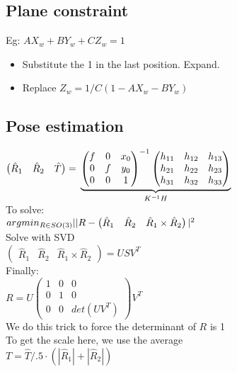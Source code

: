\subsection*{Plane constraint}
Eg: $A X_w + B Y_w + C Z_w = 1$
\begin{itemize}
  \item Substitute the 1 in the last position. Expand.
  \item Replace $Z_w = 1/C (1 - A X_w - B Y_w)$
\end{itemize}

\subsection*{Pose estimation}
$\begin{pmatrix} \hat{R}_1 & \hat{R}_2 & \hat{T}\end{pmatrix}
=\\
\underbrace{
\begin{pmatrix}
  f & 0 & x_0 \\ 0 & f &y_0\\0 & 0 & 1
\end{pmatrix}^{-1}
\begin{pmatrix}
  h_{11} & h_{12} & h_{13} \\
  h_{21} & h_{22} & h_{23} \\
  h_{31} & h_{32} & h_{33}
\end{pmatrix}
}_{K^{-1} H}
$\\
To solve:\\
$argmin_{R\in SO(3)}\\
||R -
\begin{pmatrix}
  \hat{R}_1 & \hat{R}_2 & \hat{R}_1 \times \hat{R}_2
\end{pmatrix}|^2$\\
Solve with SVD\\
$\begin{pmatrix}
  \hat{R}_1 & \hat{R}_2 & \hat{R}_1 \times \hat{R}_2
\end{pmatrix} = U S V^T$\\
Finally:\\
$R = U
\begin{pmatrix}
  1 & 0 & 0\\
  0 & 1 & 0\\
  0 & 0 & det(U V^T)
\end{pmatrix} V^T$ \\
\alert{We do this trick to force the determinant of $R$ is 1}\\
\alert{To get the scale here, we use the average}\\
$T = \hat{T}/.5\cdot(|\hat{R}_1|+|\hat{R}_2|)$

